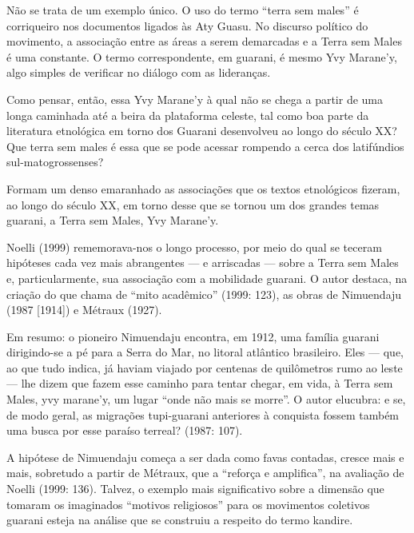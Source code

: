 \documentclass{article}
\begin{document}
N\~ao se trata de um exemplo \'unico. O uso do termo
{\textquotedblleft}terra sem males{\textquotedblright} \'e corriqueiro
nos documentos ligados \`as Aty Guasu. No discurso pol\'itico do
movimento, a associa\c{c}\~ao entre as \'areas a serem demarcadas e a
Terra sem Males \'e uma constante. O termo correspondente, em guarani,
\'e mesmo Yvy Marane{\textquoteright}y, algo simples de verificar no
di\'alogo com as lideran\c{c}as.

Como pensar, ent\~ao, essa Yvy Marane{\textquoteright}y \`a qual n\~ao
se chega a partir de uma longa caminhada at\'e a beira da plataforma
celeste, tal como boa parte da literatura etnol\'ogica em torno dos
Guarani desenvolveu ao longo do s\'eculo XX? Que terra sem males \'e
essa que se pode acessar rompendo a cerca dos latif\'undios
sul-matogrossenses?

Formam um denso emaranhado as associa\c{c}\~oes que os textos
etnol\'ogicos fizeram, ao longo do s\'eculo XX, em torno desse que se
tornou um dos grandes temas guarani, a Terra sem Males, Yvy
Marane{\textquoteright}y.

Noelli (1999) rememorava-nos o longo processo, por meio do qual se
teceram hip\'oteses cada vez mais abrangentes --- e arriscadas ---
sobre a Terra sem Males e, particularmente, sua associa\c{c}\~ao com a
mobilidade guarani. O autor destaca, na cria\c{c}\~ao do que chama de
{\textquotedblleft}mito acad\^emico{\textquotedblright} (1999: 123), as
obras de Nimuendaju (1987 [1914]) e M\'etraux (1927).

Em resumo: o pioneiro Nimuendaju encontra, em 1912, uma fam\'ilia
guarani dirigindo-se a p\'e para a Serra do Mar, no litoral atl\^antico
brasileiro. Eles --- que, ao que tudo indica, j\'a haviam viajado por
centenas de quil\^ometros rumo ao leste --- lhe dizem que fazem esse
caminho para tentar chegar, em vida, \`a Terra sem Males, yvy
marane{\textquoteright}y, um lugar {\textquotedblleft}onde n\~ao mais
se morre{\textquotedblright}. O autor elucubra: e se, de modo geral, as
migra\c{c}\~oes tupi-guarani anteriores \`a conquista fossem tamb\'em
uma busca por esse para\'iso terreal? (1987: 107).

A hip\'otese de Nimuendaju come\c{c}a a ser dada como favas contadas,
cresce mais e mais, sobretudo a partir de M\'etraux, que a
{\textquotedblleft}refor\c{c}a e amplifica{\textquotedblright}, na
avalia\c{c}\~ao de Noelli  (1999: 136). Talvez, o exemplo mais
significativo sobre a dimens\~ao que tomaram os imaginados
{\textquotedblleft}motivos religiosos{\textquotedblright} para os
movimentos coletivos guarani esteja na an\'alise que se construiu a
respeito do termo kandire.
\end{document}
